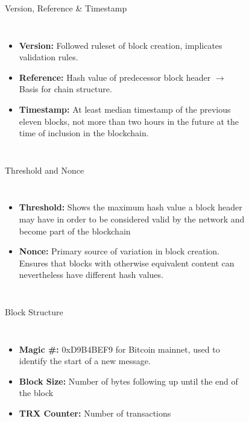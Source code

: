 \documentclass[]{beamer}
\begin{document}
\begin{frame}{Version, Reference \& Timestamp}
	\begin{columns}
		\begin{itemize}
			\item \textbf{Version:} Followed ruleset of block creation, implicates validation rules.
			\item \textbf{Reference:} Hash value of predecessor block header $\rightarrow$ Basis for chain structure.
			\item \textbf{Timestamp:} At least median timestamp of the previous eleven blocks, not more than two hours in the future at the time of inclusion in the blockchain. 
		\end{itemize}
		\begin{figure}
			
		\end{figure}
	\end{columns}
\end{frame}


\begin{frame}{Threshold and Nonce}
	\begin{columns}
	\column{0.7\textwidth}
		\begin{itemize}
			\item \textbf{Threshold:} Shows the maximum hash value a block header may have in order to be considered valid by the network and become part of the blockchain
			\item \textbf{Nonce:} Primary source of variation in block creation. Ensures that blocks with otherwise equivalent content can nevertheless have different hash values.
		\end{itemize}
	\column{0.3\textwidth}
		\begin{figure}
			
		\end{figure}
	\end{columns}
\end{frame}


\begin{frame}{Block Structure}
	\begin{columns}
	\column{0.5\textwidth}
		\begin{itemize}
			\item \textbf{Magic \#:} 0xD9B4BEF9 for Bitcoin mainnet, used to identify the start of a new message.
			\item \textbf{Block Size:} Number of bytes following up until the end of the block
			\item \textbf{TRX Counter:} Number of transactions
		\end{itemize}
	\column{0.5\textwidth}
		\begin{figure}
			\begin{tikzpicture}[domain=-8:8,scale=1.2, every node/.style={scale=1.2}]
  				
  			\end{tikzpicture}
			\end{figure}
	\end{columns}
\end{frame}
\end{document}
